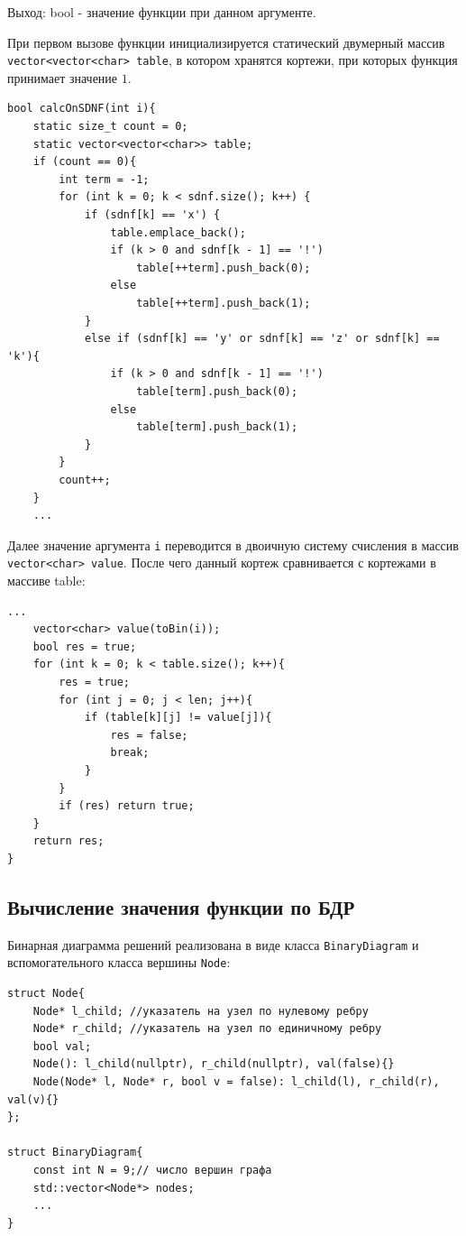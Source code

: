 \documentclass[a4paper]{article}
\theoremstyle{plain}
\theoremstyle{definition*}
\theoremstyle{remark}
\begin{document}
Выход: bool - значение функции при данном аргументе. 


При первом вызове функции инициализируется статический двумерный массив 
\lstinline{vector<vector<char> table}, в котором хранятся кортежи, 
при которых функция принимает значение $\displaystyle 1$.
\begin{lstlisting}
bool calcOnSDNF(int i){
    static size_t count = 0;
    static vector<vector<char>> table;
    if (count == 0){
        int term = -1;
        for (int k = 0; k < sdnf.size(); k++) {
            if (sdnf[k] == 'x') {
                table.emplace_back();
                if (k > 0 and sdnf[k - 1] == '!')
                    table[++term].push_back(0);
                else
                    table[++term].push_back(1);
            }
            else if (sdnf[k] == 'y' or sdnf[k] == 'z' or sdnf[k] == 'k'){
                if (k > 0 and sdnf[k - 1] == '!')
                    table[term].push_back(0);
                else
                    table[term].push_back(1);
            }
        }
        count++;
    }
    ...
\end{lstlisting}

Далее значение аргумента \lstinline{i} переводится в двоичную систему 
счисления в массив \lstinline{vector<char> value}. После чего 
данный кортеж сравнивается с кортежами в массиве table:
\begin{lstlisting}
...
    vector<char> value(toBin(i));
    bool res = true;
    for (int k = 0; k < table.size(); k++){
        res = true;
        for (int j = 0; j < len; j++){
            if (table[k][j] != value[j]){
                res = false;
                break;
            }
        }
        if (res) return true;
    }
    return res;
}
\end{lstlisting}

\newpage
\subsection{Вычисление значения функции по БДР}
Бинарная диаграмма решений реализована в виде класса 
\lstinline{BinaryDiagram} и вспомогательного класса вершины
\lstinline{Node}:
\begin{lstlisting}
struct Node{
    Node* l_child; //указатель на узел по нулевому ребру 
    Node* r_child; //указатель на узел по единичному ребру
    bool val;
    Node(): l_child(nullptr), r_child(nullptr), val(false){}
    Node(Node* l, Node* r, bool v = false): l_child(l), r_child(r), val(v){}
};

struct BinaryDiagram{
    const int N = 9;// число вершин графа
    std::vector<Node*> nodes;
    ...
}
\end{lstlisting}
\end{document}
